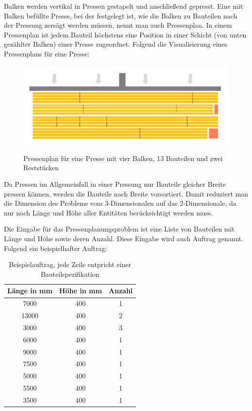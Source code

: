 Balken werden vertikal in Pressen gestapelt und anschließend gepresst.
Eine mit Balken befüllte Presse, bei der festgelegt ist, wie die Balken zu Bauteilen nach der Pressung zersägt werden müssen, nennt man auch Pressenplan.
In einem Pressenplan ist jedem Bauteil höchstens eine Position in einer Schicht (von unten gezählter Balken) einer Presse zugeordnet.
Folgend die Visualisierung eines Pressenplans für eine Presse:

\begin{figure}[h]
    \centering
    \includegraphics[width=1.00\textwidth, center]{Images/Pressenplan}\\
    \caption{Pressenplan für eine Presse mit vier Balken, 13 Bauteilen und zwei Reststücken}
    \label{figure:pressenplanproblem}
\end{figure}

Da Pressen im Allgemeinfall in einer Pressung nur Bauteile gleicher Breite pressen können, werden die Bauteile nach Breite vorsortiert.
Damit reduziert man die Dimension des Problems vom 3-Dimensionalen auf das 2-Dimensionale, da nur noch Länge und Höhe aller Entitäten berücksichtigt werden muss.

Die Eingabe für das Pressenplanungsproblem ist eine Liste von Bauteilen mit Länge und Höhe sowie deren Anzahl.
Diese Eingabe wird auch Auftrag genannt.
Folgend ein beispielhafter Auftrag:

\begin{table}[H]
    \centering
    \begin{tabular}{|c|c|c|}
        \hline
        \textbf{Länge in mm} & \textbf{Höhe in mm} & \textbf{Anzahl} \\
        \hline
        7000 & 400 & 1 \\
        13000 & 400 & 2 \\
        3000 & 400 & 3 \\
        6000 & 400 & 1 \\
        9000 & 400 & 1 \\
        7500 & 400 & 1 \\
        5000 & 400 & 1 \\
        5500 & 400 & 1 \\
        3500 & 400 & 1 \\
        \hline
    \end{tabular}
    \caption{Beispielauftrag, jede Zeile entpricht einer Bauteilspezifikation}
    \label{tab:auftrageingabe}
\end{table}

